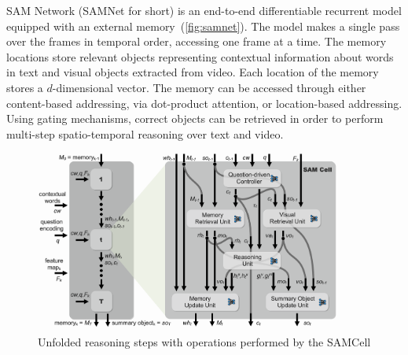 
SAM Network (SAMNet for short) is an end-to-end differentiable recurrent model equipped with an external memory~(\cref{fig:samnet}).
The model makes a single pass over the frames in temporal order, accessing one frame at a time.
The memory locations store relevant objects representing contextual information about words in text and visual objects extracted from video. 
Each location of the memory stores a $d$-dimensional vector. %
The memory can be accessed through either content-based addressing, via dot-product attention, or location-based addressing. 
Using gating mechanisms, correct objects can be retrieved 
in order to perform multi-step spatio-temporal reasoning over text and video.  


\begin{figure}[!b]
	\centering
	\includegraphics[width=0.9\textwidth]{../img/architecture/samcell_reasoning}
	\caption{Unfolded reasoning steps with operations performed by the SAMCell}
	\label{fig:samcell}
\end{figure}


